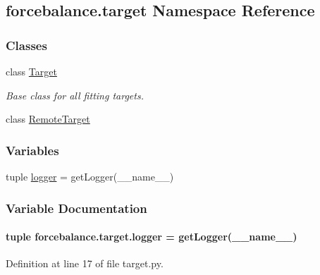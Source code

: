 \hypertarget{namespaceforcebalance_1_1target}{\subsection{forcebalance.\-target Namespace Reference}
\label{namespaceforcebalance_1_1target}
}
\subsubsection*{Classes}
\begin{DoxyCompactItemize}
\item 
class \hyperlink{classforcebalance_1_1target_1_1Target}{Target}
\begin{DoxyCompactList}\small\item\em Base class for all fitting targets. \end{DoxyCompactList}\item 
class \hyperlink{classforcebalance_1_1target_1_1RemoteTarget}{Remote\-Target}
\end{DoxyCompactItemize}
\subsubsection*{Variables}
\begin{DoxyCompactItemize}
\item 
tuple \hyperlink{namespaceforcebalance_1_1target_a976b578b7936f7ef8f929a98f3979bd7}{logger} = get\-Logger(\-\_\-\-\_\-name\-\_\-\-\_\-)
\end{DoxyCompactItemize}


\subsubsection{Variable Documentation}
\hypertarget{namespaceforcebalance_1_1target_a976b578b7936f7ef8f929a98f3979bd7}{
\paragraph[{logger}]{\setlength{\rightskip}{0pt plus 5cm}tuple forcebalance.\-target.\-logger = get\-Logger(\-\_\-\-\_\-name\-\_\-\-\_\-)}}\label{namespaceforcebalance_1_1target_a976b578b7936f7ef8f929a98f3979bd7}


Definition at line 17 of file target.\-py.

